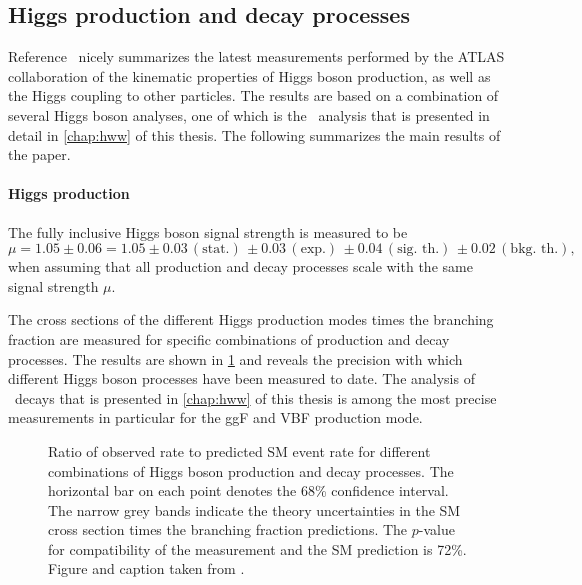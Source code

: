 \subsection{Higgs production and decay processes}
Reference~\cite{NaturePaper} nicely summarizes the latest measurements performed by the ATLAS collaboration of the kinematic properties of Higgs boson production, as well as the Higgs coupling to other particles.
The results are based on a combination of several Higgs boson analyses, one of which is the \HWW\ analysis that is presented in detail in \cref{chap:hww} of this thesis. 
The following summarizes the main results of the paper.


\paragraph{Higgs production}
The fully inclusive Higgs boson signal strength is measured to be \cite{NaturePaper}
\begin{equation*}
   \mu =1.05 \pm 0.06 = 1.05\pm 0.03\, (\text{stat.})\, \pm 0.03\, (\text{exp.})\, \pm 0.04\, (\text{sig.\ th.})\, \pm 0.02\, (\text{bkg.\ th.}),
\end{equation*}
when assuming that all production and decay processes scale with the same signal strength $\mu$.

The cross sections of the different Higgs production modes times the branching fraction are measured for specific combinations of production and decay processes. 
The results are shown in \cref{fig:prod-per-channel} and reveals the precision with which different Higgs boson processes have been measured to date. 
The analysis of \HWW\ decays that is presented in \cref{chap:hww} of this thesis is among the most precise measurements in particular for the ggF and VBF production mode.

\begin{figure}
  \caption{Ratio of observed rate to predicted SM event rate for different combinations of
  Higgs boson production and decay processes. The horizontal bar on each point denotes the 68\% confidence interval. The narrow grey bands indicate the theory uncertainties in the SM cross section times the branching
fraction predictions. The $p$-value for compatibility of the measurement and the SM prediction is
72\%. Figure and caption taken from .}
  \label{fig:prod-per-channel}
\end{figure}


